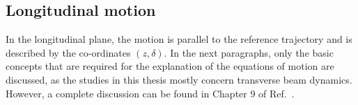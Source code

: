 





\subsection{Longitudinal motion}
In the longitudinal plane, the motion is parallel to the reference trajectory and is described by the co-ordinates $(z, \delta)$. In the next paragraphs, only the basic concepts that are required for the explanation of the equations of motion are discussed, as the studies in this thesis mostly concern transverse beam dynamics. However, a complete discussion can be found in Chapter 9 of Ref.~\cite{Wiedemann:1083415}.

